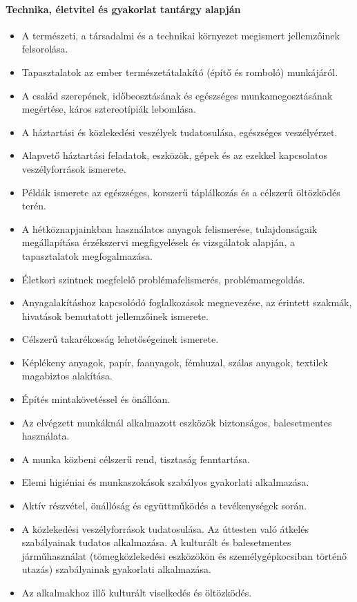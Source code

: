 \paragraph{Technika, életvitel és gyakorlat tantárgy alapján}
\begin{itemize}
\item A természeti, a társadalmi és a technikai környezet megismert jellemzőinek felsorolása.
\item Tapasztalatok az ember természetátalakító (építő és romboló) munkájáról.
\item A család szerepének, időbeosztásának és egészséges munkamegosztásának megértése, káros sztereotípiák lebomlása.
\item A háztartási és közlekedési veszélyek tudatosulása, egészséges veszélyérzet.
\item Alapvető háztartási feladatok, eszközök, gépek és az ezekkel kapcsolatos veszélyforrások ismerete.
\item Példák ismerete az egészséges, korszerű táplálkozás és a célszerű öltözködés terén.
\item A hétköznapjainkban használatos anyagok felismerése, tulajdonságaik megállapítása érzékszervi megfigyelések és vizsgálatok alapján, a tapasztalatok megfogalmazása.
\item Életkori szintnek megfelelő problémafelismerés, problémamegoldás.
\item Anyagalakításhoz kapcsolódó foglalkozások megnevezése, az érintett szakmák, hivatások bemutatott jellemzőinek ismerete.
\item Célszerű takarékosság lehetőségeinek ismerete.
\item Képlékeny anyagok, papír, faanyagok, fémhuzal, szálas anyagok, textilek magabiztos alakítása.
\item Építés mintakövetéssel és önállóan.
\item Az elvégzett munkáknál alkalmazott eszközök biztonságos, balesetmentes használata.
\item A munka közbeni célszerű rend, tisztaság fenntartása.
\item Elemi higiéniai és munkaszokások szabályos gyakorlati alkalmazása.
\item Aktív részvétel, önállóság és együttműködés a tevékenységek során.
\item A közlekedési veszélyforrások tudatosulása. Az úttesten való átkelés szabályainak tudatos alkalmazása. A kulturált és balesetmentes járműhasználat (tömegközlekedési eszközökön és személygépkocsiban történő utazás) szabályainak gyakorlati alkalmazása.
\item Az alkalmakhoz illő kulturált viselkedés és öltözködés.
\end{itemize}
